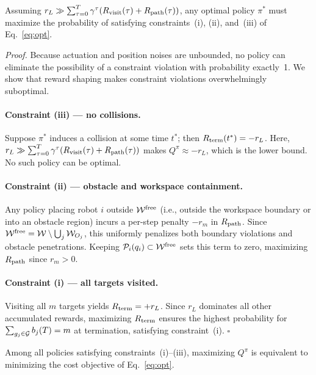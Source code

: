 \documentclass{article}
\providecommand{\free}{\mathrm{free}}
\begin{document}
\begin{lemma}
\label{lem:const}
Assuming $r_L \gg \sum_{\tau=0}^T \gamma^\tau (R_{\mathrm{visit}}(\tau) + R_{\mathrm{path}}(\tau))$, any optimal policy $\pi^*$ must maximize the probability of satisfying constraints~\textnormal{(i)}, \textnormal{(ii)}, and~\textnormal{(iii)} of Eq.~\eqref{eq:opt}.
\end{lemma}

\textit{Proof.} Because actuation and position noises are unbounded, no policy can eliminate the possibility of a constraint violation with probability exactly~1. We show that reward shaping makes constraint violations overwhelmingly suboptimal.

\paragraph{Constraint (iii) --- no collisions.} Suppose $\pi^*$ induces a collision at some time $t^*$; then $R_{\mathrm{term}}(t^*) = -r_L$. Here, $r_L \gg \sum_{\tau=0}^T \gamma^\tau (R_{\mathrm{visit}}(\tau) + R_{\mathrm{path}}(\tau))$ makes $Q^\pi \approx -r_L$, which is the lower bound. No such policy can be optimal.

\paragraph{Constraint (ii) --- obstacle and workspace containment.} Any policy placing robot $i$ outside $\wspace^{\free}$ (i.e., outside the workspace boundary or into an obstacle region) incurs a per-step penalty $-r_m$ in $R_{\mathrm{path}}$. Since $\wspace^{\free} = \wspace \setminus \bigcup_j \wspace_{O_j}$, this uniformly penalizes both boundary violations and obstacle penetrations. Keeping $\mathcal{P}_i(q_i) \subset \wspace^{\free}$ sets this term to zero, maximizing $R_{\mathrm{path}}$ since $r_m > 0$.

\paragraph{Constraint (i) --- all targets visited.} Visiting all $m$ targets yields $R_{\mathrm{term}} = +r_L$. Since $r_L$ dominates all other accumulated rewards, maximizing $R_{\mathrm{term}}$ ensures the highest probability for $\sum_{g_j \in \mathcal{G}} b_j(T) = m$ at termination, satisfying constraint~(i). \hfill$\square$

\begin{lemma}
\label{lem:cost}
Among all policies satisfying constraints~\textnormal{(i)--(iii)}, maximizing $Q^\pi$ is equivalent to minimizing the cost objective of Eq.~\eqref{eq:opt}.
\end{lemma}
\end{document}
